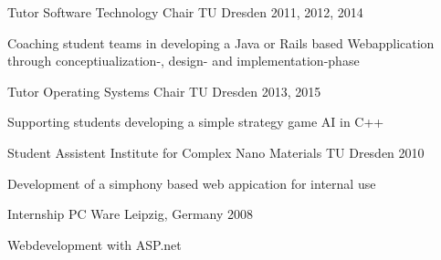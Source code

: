 \begin{cventries}

  \cventry
    {Tutor}
    {Software Technology Chair}
    {TU Dresden}
    {2011, 2012, 2014}
    {
      \begin{cvitems}
      \item[] {Coaching student teams in developing a Java or Rails based Webapplication through conceptiualization-, design- and implementation-phase}
      \end{cvitems}
    }

  \cventry
    {Tutor}
    {Operating Systems Chair}
    {TU Dresden}
    {2013, 2015}
    {
      \begin{cvitems}
      \item[] {Supporting students developing a simple strategy game AI in C++}
      \end{cvitems}
    }

  \cventry
    {Student Assistent}
    {Institute for Complex Nano Materials }
    {TU Dresden}
    {2010}
    {
      \begin{cvitems}
      \item[] {Development of a simphony based web appication for internal use}
      \end{cvitems}
    }

  \cventry
    {Internship}
    {PC Ware}
    {Leipzig, Germany}
    {2008}
    {
      \begin{cvitems}
      \item {Webdevelopment with ASP.net}
      \end{cvitems}
    }

\end{cventries}
